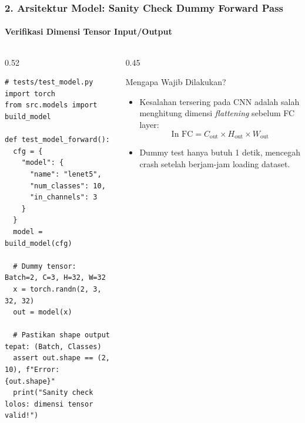 \documentclass[t,aspectratio=169,xcolor=dvipsnames]{beamer}
\begin{document}
\begin{frame}[fragile]
  \frametitle{2. Arsitektur Model: Sanity Check Dummy Forward Pass}
  \framesubtitle{Verifikasi Dimensi Tensor Input/Output}

  \begin{columns}[t]
    \begin{column}{0.52\textwidth}
\begin{lstlisting}[style=py]
# tests/test_model.py
import torch
from src.models import build_model

def test_model_forward():
  cfg = {
    "model": {
      "name": "lenet5",
      "num_classes": 10,
      "in_channels": 3
    }
  }
  model = build_model(cfg)
  
  # Dummy tensor: Batch=2, C=3, H=32, W=32
  x = torch.randn(2, 3, 32, 32)
  out = model(x)
  
  # Pastikan shape output tepat: (Batch, Classes)
  assert out.shape == (2, 10), f"Error: {out.shape}"
  print("Sanity check lolos: dimensi tensor valid!")
\end{lstlisting}
    \end{column}

    \begin{column}{0.45\textwidth}
      \begin{block}{Mengapa Wajib Dilakukan?}
        \small
        \begin{itemize}\setlength{\itemsep}{2pt}
          \item Kesalahan tersering pada CNN adalah salah menghitung dimensi \textit{flattening} sebelum FC layer:
          $$\text{In FC} = C_{\text{out}} \times H_{\text{out}} \times W_{\text{out}}$$
          \item Dummy test hanya butuh 1 detik, mencegah crash setelah berjam-jam loading dataset.
        \end{itemize}
      \end{block}
    \end{column}
  \end{columns}
\end{frame}
\end{document}

